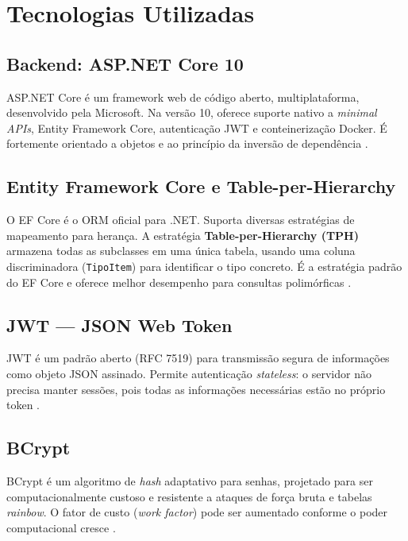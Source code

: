 \documentclass[
  12pt,
  a4paper,
  oneside,
  brazil
]{abntex2}
\begin{document}
\section{Tecnologias Utilizadas}

\subsection{Backend: ASP.NET Core 10}

ASP.NET Core é um framework web de código aberto, multiplataforma, desenvolvido pela Microsoft. Na versão 10, oferece suporte nativo a \textit{minimal APIs}, Entity Framework Core, autenticação JWT e conteinerização Docker. É fortemente orientado a objetos e ao princípio da inversão de dependência \cite{microsoft2024}.

\subsection{Entity Framework Core e Table-per-Hierarchy}

O EF Core é o ORM oficial para .NET. Suporta diversas estratégias de mapeamento para herança. A estratégia \textbf{Table-per-Hierarchy (TPH)} armazena todas as subclasses em uma única tabela, usando uma coluna discriminadora (\texttt{TipoItem}) para identificar o tipo concreto. É a estratégia padrão do EF Core e oferece melhor desempenho para consultas polimórficas \cite{smith2021}.

\subsection{JWT — JSON Web Token}

JWT é um padrão aberto (RFC 7519) para transmissão segura de informações como objeto JSON assinado. Permite autenticação \textit{stateless}: o servidor não precisa manter sessões, pois todas as informações necessárias estão no próprio token \cite{jones2015}.

\subsection{BCrypt}

BCrypt é um algoritmo de \textit{hash} adaptativo para senhas, projetado para ser computacionalmente custoso e resistente a ataques de força bruta e tabelas \textit{rainbow}. O fator de custo (\textit{work factor}) pode ser aumentado conforme o poder computacional cresce \cite{provos1999}.
\end{document}

